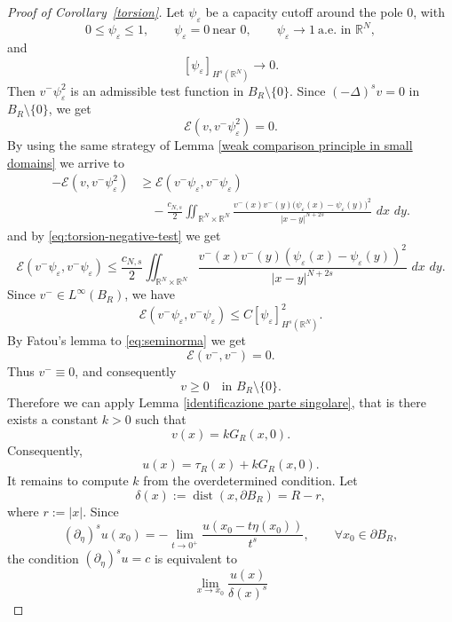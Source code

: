 \documentclass[11pt,a4paper]{article}
\newcommand{\dd}{\,d}
\newcommand{\dist}{\operatorname{dist}}
\begin{document}
\begin{proof}[Proof of Corollary~\ref{torsion}]
Let \(\psi_\varepsilon\) be a capacity cutoff around the pole \(0\), with
\[
0\le\psi_\varepsilon\le1,\qquad
\psi_\varepsilon=0\ \text{near }0,\qquad
\psi_\varepsilon\to1\ \text{a.e. in }\mathbb R^N,
\]
and
\[
[\psi_\varepsilon]_{H^s(\mathbb R^N)}\to0.
\]
Then \(v^-\psi_\varepsilon^2\) is an admissible test function in
\(B_R\setminus\{0\}\). Since \((-\Delta)^s v=0\) in $B_{R} \setminus \{0\}$, we get
\begin{equation}\label{eq:torsion-negative-test}
\mathcal E(v,v^-\psi_\varepsilon^2)=0.
\end{equation}
By using the same strategy of Lemma \ref{weak comparison principle in small domains} we arrive to 
\begin{equation*}
\begin{aligned}
-\mathcal E(v,v^{-}\psi_\varepsilon^2)
&\ge
\mathcal E(v^{-}\psi_\varepsilon,v^{-}\psi_\varepsilon)\\
&\quad -
\frac{c_{N,s}}2
\iint_{\mathbb R^N\times\mathbb R^N}
\frac{
v^{-}(x)v^{-}(y)
\bigl(
\psi_\varepsilon(x)-\psi_\varepsilon(y)
\bigr)^2
}
{|x-y|^{N+2s}}
\,\dd x\,\dd y .
\end{aligned}
\end{equation*}
and by \eqref{eq:torsion-negative-test} we get
\[
\mathcal E(v^-\psi_\varepsilon,v^-\psi_\varepsilon)
\le
\frac{c_{N,s}}2
\iint_{\mathbb R^N\times\mathbb R^N}
\frac{
v^-(x)v^-(y)(\psi_\varepsilon(x)-\psi_\varepsilon(y))^2
}
{|x-y|^{N+2s}}
\,\dd x\,\dd y.
\]
Since \(v^-\in L^\infty(B_R)\), we have
\begin{equation}\label{eq:seminorma}
\mathcal E(v^-\psi_\varepsilon,v^-\psi_\varepsilon) \le C[\psi_\varepsilon]_{H^s(\mathbb R^N)}^2.
\end{equation}
By Fatou's lemma to \eqref{eq:seminorma} we get
\[
\mathcal E(v^-,v^-)=0.
\]
Thus \(v^-\equiv0\), and consequently
\[
v\ge0
\quad\text{in }B_R\setminus\{0\}.
\]
Therefore we can apply Lemma \ref{identificazione parte singolare}, that is there exists a constant
\(k>0\) such that
\[
v(x)=k G_{R}(x,0).
\]
Consequently,
\begin{equation}\label{eq:decomposizione esplicita}
u(x)=\tau_{R}(x)+k G_{R}(x,0).
\end{equation}
It remains to compute \(k\) from the overdetermined condition. Let
\[
\delta(x):=\dist(x,\partial B_R)=R-r,
\]
where $r:=|x|.$ Since
\[
(\partial_\eta)^s u(x_0)
=
-\lim_{t\to0^+}
\frac{u(x_0-t\eta(x_0))}{t^s},
\qquad \forall x_0\in\partial B_R,
\]
the condition \((\partial_\eta)^s u=c\) is equivalent to
\[
\lim_{x\to x_0}
\frac{u(x)}{\delta(x)^s}
\]
\end{proof}
\end{document}
